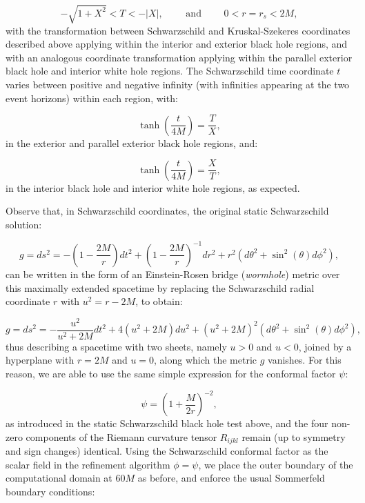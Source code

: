 \documentclass{article}
\begin{document}
\begin{equation}
- \sqrt{1 + X^2} < T < - \left\lvert X \right\rvert, \qquad \text{ and } \qquad 0 < r = r_s < 2M,
\end{equation}
with the transformation between Schwarzschild and Kruskal-Szekeres coordinates described above applying within the interior and exterior black hole regions, and with an analogous coordinate transformation applying within the parallel exterior black hole and interior white hole regions. The Schwarzschild time coordinate $t$ varies between positive and negative infinity (with infinities appearing at the two event horizons) within each region, with:

\begin{equation}
\tanh \left( \frac{t}{4M} \right) = \frac{T}{X},
\end{equation}
in the exterior and parallel exterior black hole regions, and:

\begin{equation}
\tanh \left( \frac{t}{4M} \right) = \frac{X}{T},
\end{equation}
in the interior black hole and interior white hole regions, as expected.

Observe that, in Schwarzschild coordinates, the original static Schwarzschild solution:

\begin{equation}
g = ds^2 = - \left( 1 - \frac{2M}{r} \right) dt^2 + \left( 1 - \frac{2M}{r} \right)^{-1} dr^2 + r^2 \left(d \theta^2 + \sin^2 \left( \theta \right) d \phi^2 \right),
\end{equation}
can be written in the form of an Einstein-Rosen bridge (\textit{wormhole}) metric over this maximally extended spacetime by replacing the Schwarzschild radial coordinate $r$ with ${u^2 = r - 2M}$, to obtain:

\begin{equation}
g = ds^2 = - \frac{u^2}{u^2 + 2M} dt^2 + 4 \left( u^2 + 2M \right) du^2 + \left( u^2 + 2M \right)^2 \left( d \theta^2 + \sin^2 \left( \theta \right) d \phi^2 \right),
\end{equation}
thus describing a spacetime with two sheets, namely ${u > 0}$ and ${u < 0}$, joined by a hyperplane with ${r = 2M}$ and ${u = 0}$, along which the metric $g$ vanishes. For this reason, we are able to use the same simple expression for the conformal factor ${\psi}$:

\begin{equation}
\psi = \left( 1 + \frac{M}{2r} \right)^{-2},
\end{equation}
as introduced in the static Schwarzschild black hole test above, and the four non-zero components of the Riemann curvature tensor ${R_{i j k l}}$ remain (up to symmetry and sign changes) identical. Using the Schwarzschild conformal factor as the scalar field in the refinement algorithm ${\phi = \psi}$, we place the outer boundary of the computational domain at ${60 M}$ as before, and enforce the usual Sommerfeld boundary conditions:
\end{document}
